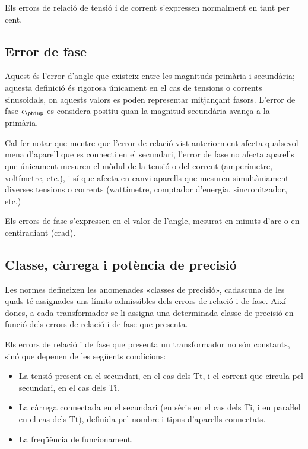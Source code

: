 Els errors de relació de tensió i de corrent s'expressen
normalment en tant per cent.

\subsection{Error de fase}

Aquest és l'error d'angle  que existeix entre les magnituds primària i
secundària; aquesta definició és rigorosa únicament en el cas de
tensions o corrents sinusoidals, on aquests valors es poden
representar mitjançant fasors. L'error de fase $\epsilon\ped{\phiup}$ es considera positiu quan la magnitud secundària avança a la primària.
\index{$\epsilon\ped{\phiup}$}

 Cal fer notar que mentre que l'error de relació
vist anteriorment afecta qualsevol mena d'aparell que es
connecti en el secundari, l'error de fase no afecta aparells que
únicament mesuren el mòdul de la tensió o del corrent (amperímetre,
voltímetre, etc.), i sí que afecta en canvi aparells que mesuren
simultàniament diverses tensions o corrents (wattímetre, comptador
d'energia, sincronitzador, etc.)

Els errors de fase s'expressen en el valor de l'angle, mesurat en
minuts d'arc o en centiradiant (crad).

\subsection{Classe, càrrega i potència de precisió}

Les normes defineixen les anomenades «classes de precisió»,
cadascuna de les quals té assignades uns límits admissibles dels
errors de relació i de fase. Així doncs, a cada transformador
se li assigna una determinada classe de precisió en funció dels errors
de relació i de fase que presenta.

Els errors de relació i de fase que presenta un transformador no són
constants, sinó que depenen de les següents condicions:
\begin{itemize}
   \item La tensió present en el secundari, en el cas dels Tt, i el corrent que
   circula    pel secundari, en el cas dels Ti.
   \item La càrrega connectada en el secundari (en sèrie en el cas dels Ti,
   i en paraŀlel en el cas dels Tt), definida pel nombre i tipus d'aparells connectats.
   \item La freqüència de funcionament.
\end{itemize}

